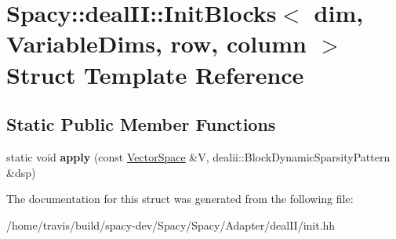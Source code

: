 \hypertarget{structSpacy_1_1dealII_1_1InitBlocks}{\section{Spacy\-:\-:deal\-I\-I\-:\-:Init\-Blocks$<$ dim, Variable\-Dims, row, column $>$ Struct Template Reference}
\label{structSpacy_1_1dealII_1_1InitBlocks}
}
\subsection*{Static Public Member Functions}
\begin{DoxyCompactItemize}
\item 
\hypertarget{structSpacy_1_1dealII_1_1InitBlocks_a3b94171837f4cad70dfb03a2543a8f92}{static void {\bfseries apply} (const \hyperlink{classSpacy_1_1VectorSpace}{Vector\-Space} \&V, dealii\-::\-Block\-Dynamic\-Sparsity\-Pattern \&dsp)}\label{structSpacy_1_1dealII_1_1InitBlocks_a3b94171837f4cad70dfb03a2543a8f92}

\end{DoxyCompactItemize}


The documentation for this struct was generated from the following file\-:\begin{DoxyCompactItemize}
\item 
/home/travis/build/spacy-\/dev/\-Spacy/\-Spacy/\-Adapter/deal\-I\-I/init.\-hh\end{DoxyCompactItemize}
